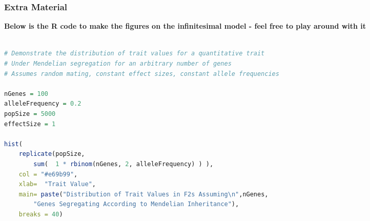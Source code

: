 \documentclass{beamer}
\begin{document}
\begin{frame}[fragile]
	\frametitle{Extra Material}
	
	\textbf{Below is the R code to make the figures on the infinitesimal model - feel free to play around with it}
	\begin{adjustbox}{max width=\textwidth}
		
	\begin{lstlisting}[language=R]

# Demonstrate the distribution of trait values for a quantitative trait
# Under Mendelian segregation for an arbitrary number of genes
# Assumes random mating, constant effect sizes, constant allele frequencies
	
nGenes = 100
alleleFrequency = 0.2
popSize = 5000
effectSize = 1
			
hist( 
	replicate(popSize,
		sum(  1 * rbinom(nGenes, 2, alleleFrequency) ) ),
	col = "#e69b99",
	xlab=  "Trait Value",
	main= paste("Distribution of Trait Values in F2s Assuming\n",nGenes, 
		"Genes Segregating According to Mendelian Inheritance"),
	breaks = 40)
		\end{lstlisting}
\end{adjustbox}
\end{frame}


\end{document}
